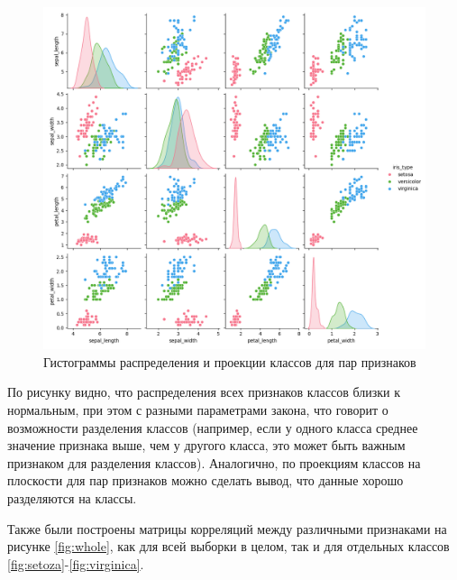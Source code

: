 \documentclass[12pt]{report}
\begin{document}
\begin{figure}[h!]
  \centering
  \includegraphics[width = \linewidth]{pairs.png}
  \caption{Гистограммы распределения и проекции классов для пар признаков}
  \label{fig:pairs}
\end{figure}

По рисунку видно, что распределения всех признаков классов близки к нормальным, при этом с разными параметрами закона, что говорит о возможности разделения классов (например, если у одного класса среднее значение признака выше, чем у другого класса, это может быть важным признаком для разделения классов). Аналогично, по проекциям классов на плоскости для пар признаков можно сделать вывод, что данные хорошо разделяются на классы. 


Также были построены матрицы корреляций между различными признаками на рисунке \ref{fig:whole}, как для всей выборки в целом, так и для отдельных классов \ref{fig:setoza}-\ref{fig:virginica}.
\end{document}
